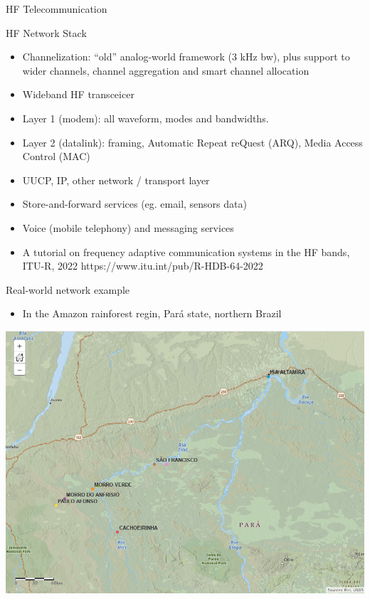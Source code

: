 \documentclass[aspectratio=169,xcolor={x11names,svgnames,dvipsnames}]{beamer}
\begin{document}
\begin{frame}{HF Telecommunication}

\begin{block}{HF Network Stack}
    \begin{itemize}
    \item Channelization: ``old'' analog-world framework (3 kHz bw), plus support to wider channels, channel aggregation and smart channel allocation
    \item Wideband HF transceicer
    \item Layer 1 (modem): all waveform, modes and bandwidths.
    \item Layer 2 (datalink): framing, Automatic Repeat reQuest (ARQ), Media Access Control (MAC)
    \item UUCP, IP, other network / transport layer
    \item Store-and-forward services (eg. email, sensors data)
    \item Voice (mobile telephony) and messaging services
    \item A tutorial on frequency adaptive communication systems in the HF bands, ITU-R, 2022 https://www.itu.int/pub/R-HDB-64-2022
    \end{itemize}
  \end{block}

\end{frame}

\begin{frame}{Real-world network example}

  \begin{itemize}
  \item In the Amazon rainforest regin, Pará state, northern Brazil
  \end{itemize}

\begin{center}
  \includegraphics[width=.57\columnwidth]{radio_stations.png}
\end{center}

\end{frame}
\end{document}
